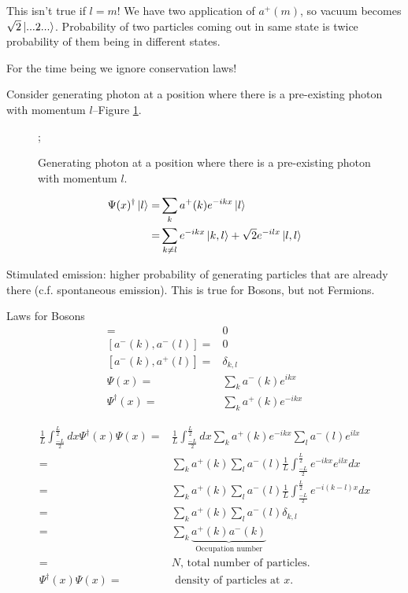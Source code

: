 \documentclass[]{article}
\begin{document}
This isn't true if $l=m$! We have two application of $a^+(m)$, so vacuum becomes $\sqrt{2}\ket{...2...}$. Probability of two particles coming out in same state is twice probability of them being in different states.

For the time being we ignore conservation laws!

Consider generating photon at a position where there is a pre-existing photon with momentum $l$--Figure \ref{fig:simple:decay}.
\begin{figure}[H]
	\begin{center}
		\caption[Generating photon  where there is a pre-existing photon]{Generating photon at a position where there is a pre-existing photon with momentum $l$.}\label{fig:simple:decay}
		;
	\end{center}
\end{figure}

\begin{align*}
\Psi(x)^\dagger\ket{l} =& \sum_k a^+(k) e^{-ikx} \ket{l}\\
=& \sum_{k\ne l} e^{-ikx} \ket{k,l} + \sqrt{2} e^{-ilx} \ket{l,l}
\end{align*}

Stimulated emission: higher probability of generating particles that are already there (c.f. spontaneous emission). This is true for Bosons, but not Fermions.
 
 Laws for Bosons
 \begin{align*}
 [a^+(k),a^+(l)] =& 0\\
 [a^-(k),a^-(l)] =& 0\\
 [a^-(k),a^+(l)] =& \delta_{k,l}\\
 \Psi(x) =& \sum_k a^-(k) e^{ikx} \\
 \Psi^\dagger(x) =& \sum_k a^+(k) e^{-ikx}
 \end{align*}
 
 \begin{align*}
 \frac{1}{L}\int_\frac{-L}{2}^\frac{L}{2} dx \Psi^\dagger(x) \Psi(x) =& \frac{1}{L} \int_\frac{-L}{2}^\frac{L}{2} dx \sum_k a^+(k) e^{-ikx} \sum_l a^-(l) e^{ilx}\\
 =& \sum_k a^+(k) \sum_l a^-(l) \frac{1}{L} \int_\frac{-L}{2}^\frac{L}{2} e^{-ikx} e^{ilx} dx\\
 =& \sum_k a^+(k) \sum_l a^-(l) \frac{1}{L} \int_\frac{-L}{2}^\frac{L}{2} e^{-i(k-l)x} dx\\
  =& \sum_k a^+(k) \sum_l a^-(l) \delta_{k,l}\\
 =&  \sum_k \underbrace{a^+(k) a^-(k)}_\text{Occupation number}\\
 =& N \text{, total number of particles.}\\
 \Psi^\dagger(x) \Psi(x) =& \text{ density of particles at $x$}.
 \end{align*}
\end{document}
